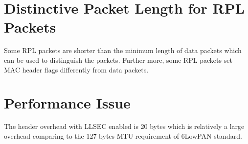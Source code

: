 \section{Distinctive Packet Length for RPL Packets}
Some RPL packets are shorter than the minimum length of data packets which can be used to distinguish the packets. Further more, some RPL packets set MAC header flags differently from data packets.

\section{Performance Issue}
The header overhead with LLSEC enabled is 20 bytes which is relatively a large overhead comparing to the 127 bytes MTU requirement of 6LowPAN standard\cite{rfc4944}.